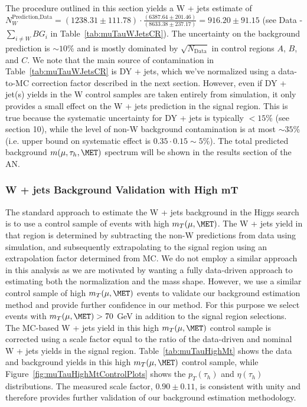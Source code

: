 The procedure outlined in this section yields a W + jets estimate of $N_{W}^{\textrm{Prediction,Data}} = (1238.31 \pm 111.78) \cdot \frac{(6387.64 
\pm 201.46)}{(8633.38 \pm 237.17)} = 916.20 \pm 91.15$ (see Data - $\sum\limits_{i\neq W} BG_{i}$ in Table~\ref{tab:muTauWJetsCR}). The uncertainty on the 
background prediction is $\sim 10$\% and is mostly dominated by $\sqrt{N_{\textrm{Data}}}$ in control regions $A$, $B$, and $C$. We note that the main source of 
contamination in Table~\ref{tab:muTauWJetsCR} is DY + jets, which we've normalized using a data-to-MC correction factor described in the next section. However, 
even if DY + jet(s) yields in the W control samples are taken entirely from simulation, it only provides a small effect on the W + jets prediction in the signal region. This is true 
because the systematic uncertainty for DY + jets is typically $< 15$\% (see section 10), while the level of non-W background contamination is at most $\sim 35$\% 
(i.e. upper bound on systematic effect is $0.35 \cdot 0.15 \sim 5$\%). The total predicted background
$m(\mu,\tau_{h},\MET)$ spectrum will be shown in the results section of the AN.

\subsubsection{W + jets Background Validation with High mT}

The standard approach to estimate the W + jets background in the Higgs search is to use a control sample of events with high $m_{T}(\mu,\MET)$. 
The W + jets yield in that region is determined by subtracting the non-W predictions from data using simulation, and subsequently extrapolating to the 
signal region using an extrapolation factor determined from MC. We do not employ a similar approach in this analysis as we are motivated by wanting a fully 
data-driven approach to estimating both the normalization and the mass shape. However, we use a similar control sample of high $m_{T}(\mu,\MET)$ events to 
validate our background estimation method and provide further confidence in our method. For this purpose we select events with $m_{T}(\mu,\MET) > 70$ GeV in 
addition to the signal region selections. The MC-based W + jets yield in this high $m_{T}(\mu,\MET)$ control sample is corrected using a scale factor equal to the 
ratio of the data-driven and nominal W + jets yields in the signal region. Table~\ref{tab:muTauHighMt} shows the data and background yields in this high 
$m_{T}(\mu,\MET)$ control sample, while Figure~\ref{fig:muTauHighMtControlPlots} shows the $p_{T}(\tau_{h})$ and $\eta(\tau_{h})$ distributions. The measured 
scale factor, $0.90 \pm 0.11$, is consistent with unity and therefore provides further validation of our background estimation methodology.

